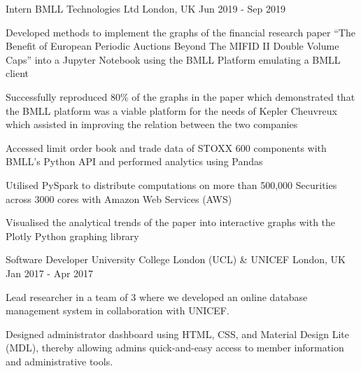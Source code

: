 
\begin{cventries}
  \cventry
    {Intern} %
    {BMLL Technologies Ltd} %
    {London, UK} %
    {Jun 2019 - Sep 2019} %
    {
      \begin{cvitems} %
        \item {Developed methods to implement the graphs of the financial research paper ``The Benefit of European Periodic Auctions Beyond The MIFID II Double Volume Caps'' into a Jupyter Notebook using the BMLL Platform emulating a BMLL client}
        \item {Successfully reproduced 80\% of the graphs in the paper which demonstrated that the BMLL platform was a viable platform for the needs of Kepler Cheuvreux which assisted in improving the relation between the two companies }
        \item {Accessed limit order book and trade data of STOXX 600 components with BMLL’s Python API and performed analytics using Pandas}
        \item{Utilised PySpark to distribute computations on more than 500,000 Securities across 3000 cores with Amazon Web Services (AWS)}
        \item{Visualised the analytical trends of the paper into interactive graphs with the Plotly Python graphing library}
      \end{cvitems}
    }

  \cventry
    {Software Developer} %
    {University College London (UCL) \& UNICEF} %
    {London, UK} %
    {Jan 2017 - Apr 2017} %
    {
      \begin{cvitems} %
        \item {Lead researcher in a team of 3 where we developed an online database management system in collaboration with UNICEF.}
        \item {Designed administrator dashboard using HTML, CSS, and Material Design Lite (MDL), thereby allowing admins quick-and-easy access to member information and administrative tools. }
      \end{cvitems}
    }
\end{cventries}
